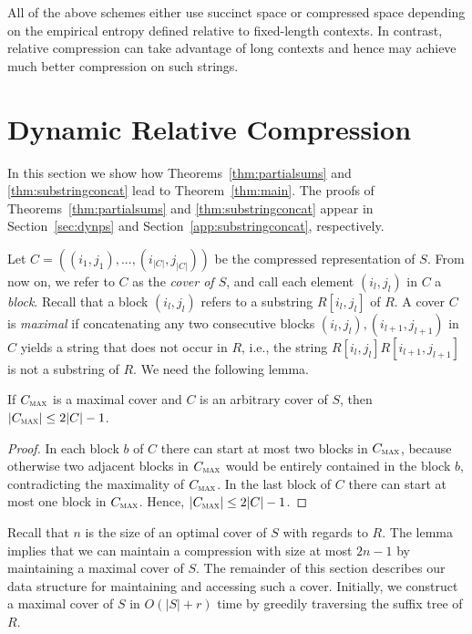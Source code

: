 All of the above schemes either use succinct space or compressed space depending on the empirical entropy defined relative to fixed-length contexts. In contrast, relative compression can take advantage of long contexts and hence may achieve much better compression on such strings.

\section{Dynamic Relative Compression}\label{sec:DRC}
In this section we show how Theorems~\ref{thm:partialsums} and \ref{thm:substringconcat} lead to Theorem~\ref{thm:main}. The proofs of Theorems~\ref{thm:partialsums} and \ref{thm:substringconcat} appear in Section~\ref{sec:dynps} and Section~\ref{app:substringconcat}, respectively. 

Let $C=((i_1,j_1),...,(i_{|C|},j_{|C|}))$ be the compressed representation of $S$. From now on, we refer to $C$ as the \emph{cover of $S$}, and call each element $(i_l,j_l)$ in $C$ a \emph{block}. Recall that a block $(i_l,j_l)$ refers to a substring $R[i_l,j_l]$ of $R$.
A cover $C$ is \emph{maximal} if 
concatenating any two consecutive blocks $(i_l,j_l),(i_{l+1},j_{l+1})$ in $C$ yields a string that does not occur in $R$, 
i.e., the string $R[i_l,j_l]R[i_{l+1},j_{l+1}]$ is not a substring of $R$. We need the following lemma.


\begin{lemma}\label{lem:maxcover}
If $C_\textsc{max}$ is a maximal cover and $C$ is an arbitrary cover of $S$, then $|C_\textsc{max}| \leq 2|C|-1$.
\end{lemma}
\begin{proof}
In each block $b$ of $C$ there can start at most two blocks in $C_\textsc{max}$, because otherwise two adjacent blocks in $C_\textsc{max}$ would be entirely contained in the block $b$, contradicting the maximality of $C_\textsc{max}$. In the last block of $C$ there can start at most one block in $C_\textsc{max}$. Hence, $|C_\textsc{max}| \leq 2|C|-1$.
\end{proof}
Recall that $n$ is the size of an optimal cover of $S$ with regards to $R$. 
The lemma implies that we can maintain a compression with size at most $2n-1$ by maintaining a maximal cover of $S$.
The remainder of this section describes our data structure for maintaining and accessing such a cover.
Initially, we construct a maximal cover of $S$ in $O(|S|+r)$ time by greedily traversing the suffix tree of $R$.


